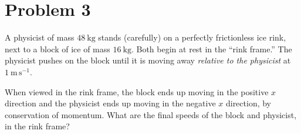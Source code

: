 \documentclass[12pt]{article}
\begin{document}
\clearpage

\section*{Problem 3}

A physicist of mass $48~\mathrm{kg}$ stands (carefully) on a perfectly
frictionless ice rink, next to a block of ice of mass
$16~\mathrm{kg}$.  Both begin at rest in the ``rink frame.''  The
physicist pushes on the block until it is moving away \emph{relative
to the physicist} at $1~\mathrm{m\,s^{-1}}$.

When viewed in the rink frame, the block ends up moving in the
positive $x$ direction and the physicist ends up moving in the
negative $x$ direction, by conservation of momentum.  What are the
final speeds of the block and physicist, in the rink frame?
\end{document}
